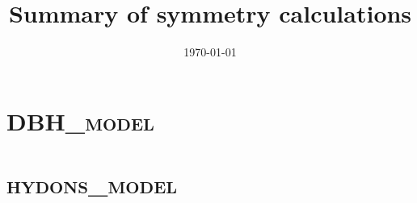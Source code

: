 \documentclass{book}
\begin{document}
\title{\textbf{Summary of symmetry calculations}}
\date{\today}
\maketitle
\tableofcontents
\clearpage
\chapter{\textsc{DBH\_model}}


\chapter{\textsc{hydons\_model}}

\end{document}
